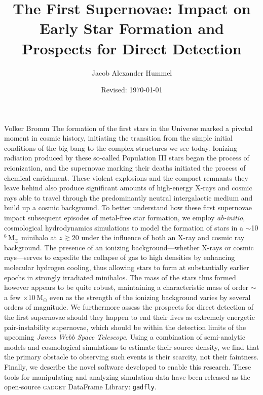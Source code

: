 \documentclass[12pt, double]{thesis}
\newcommand{\msun}{\ensuremath{\,\mathrm{M}_{\odot}}\xspace}
\begin{document}
\author{Jacob Alexander Hummel} 
\title{The First Supernovae: Impact on Early Star Formation and Prospects for Direct Detection} 
\date{Revised: \today}

\UTcopyrightlegend %

\begin{UTcommittee}
\end{UTcommittee}


\frontmatter

\setcounter{page}{4}

%
%

\begin{UTabstract}{Volker Bromm}
The formation of the first stars in the Universe marked a pivotal moment in cosmic history, initiating the transition from the simple initial conditions of the big bang to the complex structures we see today.
Ionizing radiation produced by these so-called Population III stars began the process of reionization, and the supernovae marking their deaths initiated the process of chemical enrichment. 
These violent explosions and the compact remnants they leave behind also produce significant amounts of high-energy X-rays and cosmic rays able  to travel through the predominantly neutral intergalactic medium and build up a cosmic background.
To better understand how these first supernovae impact subsequent episodes of metal-free star formation, we employ \textit{ab-initio}, cosmological hydrodynamics simulations to model the formation of stars in a $\sim$10$^6\msun$ minihalo at $z \gtrsim 20$ under the influence of both an X-ray and cosmic ray background.
The presence of an ionizing background---whether X-rays or cosmic rays---serves to expedite the collapse of gas to high densities by enhancing molecular hydrogen cooling, thus allowing stars to form at substantially earlier epochs in strongly irradiated minihalos.
The mass of the stars thus formed however appears to be quite robust, maintaining a characteristic mass of order $\sim$ a few $\times10\msun$ even as the strength of the ionizing background varies by several orders of magnitude.
We furthermore assess the prospects for direct detection of the first supernovae should they happen to end their lives as extremely energetic pair-instability supernovae, which should be within the detection limits of the upcoming \textit{James Webb Space Telescope}.
Using a combination of semi-analytic models and cosmological simulations to estimate their source density, we find that the primary obstacle to observing such events is their scarcity, not their faintness.
Finally, we describe the novel software developed to enable this research.  These tools for manipulating and analyzing simulation data have been released as the open-source \textsc{gadget} DataFrame Library: \verb|gadfly|.
\end{UTabstract}
\end{document}
